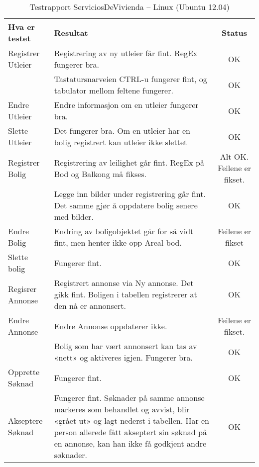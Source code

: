 \begin{table}

\caption{Testrapport ServiciosDeVivienda – Linux (Ubuntu 12.04)}
\label{tab:test1}

\begin{tabular}{|l|p{7cm}|c|}
\hline
\textbf{\large Hva er testet}
&
\textbf{\large Resultat}
&
\textbf{\large Status}
\\ \hline
Registrer Utleier
&
Registrering av ny utleier får fint. RegEx fungerer bra.
&
OK
\\ \hline

&
Tastatursnarveien CTRL-u fungerer fint, og tabulator mellom feltene fungerer.
&
OK
\\ \hline
Endre Utleier
&
Endre informasjon om en utleier fungerer bra.
&
OK
\\ \hline
Slette Utleier
&
Det fungerer bra. Om en utleier har en bolig registrert kan utleier ikke slettet
&
OK
\\ \hline
Registrer Bolig
&
Registrering av leilighet går fint. RegEx på Bod og Balkong må fikses.
&
Alt OK.
Feilene er fikset.
\\ \hline

&
Legge inn bilder under registrering går fint. Det samme gjør å oppdatere bolig senere med bilder.
&
OK
\\ \hline
Endre Bolig
&
Endring av boligobjektet går for så vidt fint, men henter ikke opp Areal bod.
&
Feilene er fikset
\\ \hline
Slette bolig
&
Fungerer fint.
&
OK
\\ \hline
Regisrer Annonse
&
Registrert annonse via Ny annonse. Det gikk fint.
Boligen i tabellen registrerer at den nå er annonsert.
&
OK
\\ \hline
Endre Annonse
&
Endre Annonse oppdaterer ikke.
&
Feilene er fikset.
\\ \hline

&
Bolig som har vært annonsert kan tas av «nett» og aktiveres igjen. Fungerer bra.
&
OK
\\ \hline
Opprette Søknad
&
Fungerer fint.
&
OK
\\ \hline
Akseptere Søknad
&
Fungerer fint. Søknader på samme annonse markeres som behandlet og avvist, blir «grået ut» og lagt nederst i tabellen.
Har en person allerede fått akseptert sin søknad på en annonse, kan han ikke få godkjent andre søknader.
&
OK
\\ \hline

\end{tabular}

\end{table}





